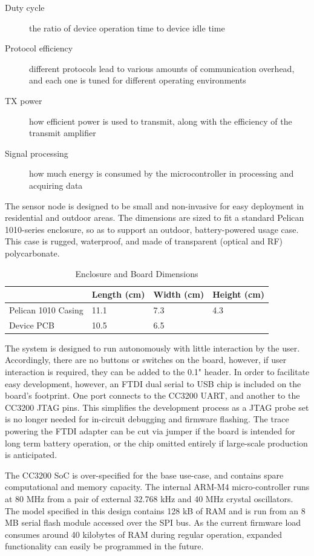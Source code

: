 \begin{description}
\item[Duty cycle] the ratio of device operation time to device idle time
\item[Protocol efficiency] different protocols lead to various amounts of communication overhead, and each one is tuned for different operating environments
\item[TX power] how efficient power is used to transmit, along with the efficiency of the transmit amplifier
\item[Signal processing] how much energy is consumed by the microcontroller in processing and acquiring data 
\end{description}

The sensor node is designed to be small and non-invasive for easy deployment in residential and outdoor areas. The dimensions are sized to fit a standard Pelican 1010-series enclosure, so as to support an outdoor, battery-powered usage case. This case is rugged, waterproof, and made of transparent (optical and RF) polycarbonate.

\begin{table}[h]
\begin{tabular}{@{}l|lll@{}}
                    & Length (cm) & Width (cm) & Height (cm) \\ \midrule
Pelican 1010 Casing & 11.1        & 7.3        & 4.3         \\
Device PCB          & 10.5        & 6.5        &            
\end{tabular}
\caption{Enclosure and Board Dimensions}
\label{dimensions}
\end{table}

The system is designed to run autonomously with little interaction by the user. Accordingly, there are no buttons or switches on the board, however, if user interaction is required, they can be added to the 0.1" header. In order to facilitate easy development, however, an FTDI dual serial to USB chip is included on the board's footprint. One port connects to the CC3200 UART, and another to the CC3200 JTAG pins. This simplifies the development process as a JTAG probe set is no longer needed for in-circuit debugging and firmware flashing. The trace powering the FTDI adapter can be cut via jumper if the board is intended for long term battery operation, or the chip omitted entirely if large-scale production is anticipated.

The CC3200 SoC is over-specified for the base use-case, and contains spare computational and memory capacity. The internal ARM-M4 micro-controller runs at 80 MHz from a pair of external 32.768 kHz and 40 MHz crystal oscillators. The model specified in this design contains 128 kB of RAM and is run from an 8 MB serial flash module accessed over the SPI bus. As the current firmware load consumes around 40 kilobytes of RAM during regular operation, expanded functionality can easily be programmed in the future.

